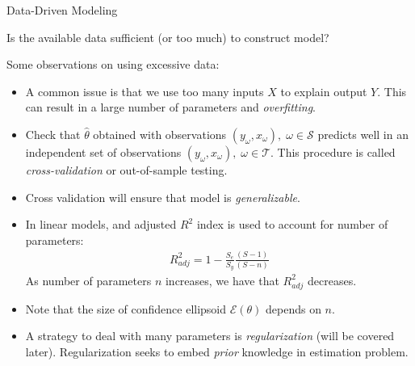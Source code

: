 \documentclass[9pt]{beamer}
\begin{document}
%
\begin{frame}{Data-Driven Modeling}

\begin{block}{}
Is the available data sufficient (or too much) to construct model?
\end{block}
Some observations on using excessive data:
\begin{itemize}
\item A common issue is that we use too many inputs $X$ to explain output $Y$. This can result in a large number of parameters and {\em overfitting}. 
\item Check that $\hat{\theta}$ obtained with observations $(y_\omega,x_\omega),\; \omega \in \mathcal{S}$ predicts well in an independent set of observations $(y_\omega,x_\omega),\; \omega \in \mathcal{T}$. This procedure is called {\em cross-validation} or out-of-sample testing. 
\item Cross validation will ensure that model is {\em generalizable}. 
\item In linear models, and adjusted $R^2$ index is used to account for number of parameters:
\begin{align*}
R^2_{adj}=1-\frac{S_e}{S_y}\frac{(S-1)}{(S-n)}
\end{align*}
As number of parameters $n$ increases, we have that $R^2_{adj}$ decreases. 
\item Note that the size of confidence ellipsoid $\mathcal{E}(\theta)$ depends on $n$.
\item A strategy to deal with many parameters is {\em regularization} (will be covered later). Regularization seeks to embed {\em prior} knowledge in estimation problem. 
\end{itemize}

\end{frame}
\end{document}

